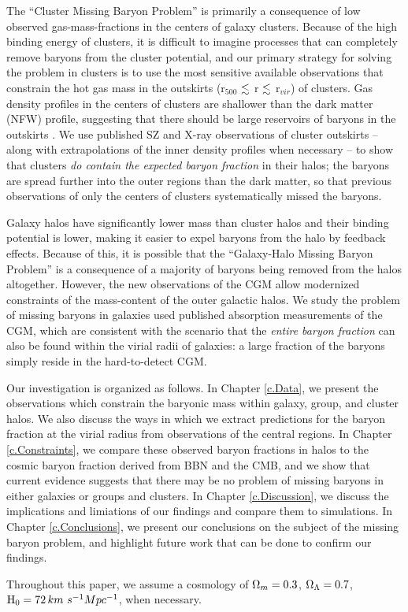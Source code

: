 The ``Cluster Missing Baryon Problem'' is primarily a
consequence of low observed gas-mass-fractions in the centers of
galaxy clusters. Because of the high binding energy of clusters, it is
difficult to imagine processes that can completely remove baryons from
the cluster potential, and our primary strategy for solving the
problem in clusters is to use the most sensitive available
observations that constrain the hot gas mass in the outskirts
(r$_{500}$ $\lesssim$ r $\lesssim$ r$_{vir}$) of clusters. Gas density
profiles in the centers of clusters are shallower than the dark matter
(NFW) profile, suggesting that there should be large reservoirs of
baryons in the outskirts . We use published SZ and
X-ray observations of cluster outskirts -- along with extrapolations
of the inner density profiles when necessary -- to show that clusters
\textit{do contain the expected baryon fraction} in their halos; the
baryons are spread further into the outer regions than the dark
matter, so that previous observations of only the centers of clusters
systematically missed the baryons.

Galaxy halos have significantly lower mass than cluster halos and
their binding potential is lower, making it easier to expel baryons
from the halo by feedback effects. Because of this, it is possible
that the ``Galaxy-Halo Missing Baryon Problem'' is a consequence of a
majority of baryons being removed from the halos altogether. However,
the new observations of the CGM allow modernized constraints of the
mass-content of the outer galactic halos. We study the problem of
missing baryons in galaxies used published absorption measurements of
the CGM, which are consistent with the scenario that the
\textit{entire baryon fraction} can also be found within the virial
radii of galaxies: a large fraction of the baryons simply reside in
the hard-to-detect CGM.

Our investigation is organized as follows. In Chapter \ref{c.Data}, we
present the observations which constrain the baryonic mass within
galaxy, group, and cluster halos. We also discuss the ways in which we
extract predictions for the baryon fraction at the virial radius from
observations of the central regions. In Chapter \ref{c.Constraints},
we compare these observed baryon fractions in halos to the cosmic
baryon fraction derived from BBN and the CMB, and we show that current
evidence suggests that there may be no problem of missing baryons in
either galaxies or groups and clusters. In Chapter \ref{c.Discussion},
we discuss the implications and limiations of our findings and
compare them to simulations. In Chapter \ref{c.Conclusions}, we
present our conclusions on the subject of the missing baryon problem,
and highlight future work that can be done to confirm our findings. 

Throughout this paper, we assume a cosmology of $\Omega_m = 0.3$,
$\Omega_\Lambda = 0.7$, $\textrm{H\ensuremath{_0}} = 72\,km~s^{-1}{}Mpc^{-1}$, when
necessary. 
